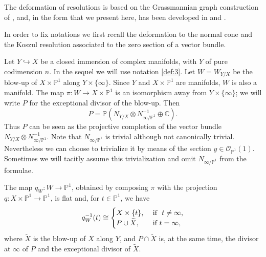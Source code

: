 \documentclass[10pt,twoside]{article}
\numberwithin{equation}{section}
\theoremstyle{plain}
\theoremstyle{definition}
\begin{document}
The deformation
of resolutions is based on the Grassmannian 
graph construction of \cite{BaumFultonMacPherson:RRsv}, and, in the
form that we present here, has been developed in  
\cite{BismutGilletSoule:MR1086887} and \cite{GilletSoule:aRRt}.

In order to fix notations we first recall the deformation to the
normal cone and the Koszul resolution associated to the
zero section of a vector bundle.

Let $Y\hookrightarrow X$ be a closed immersion of complex manifolds,
with $Y$ of pure codimension $n$. In the sequel we will use 
notation \ref{def:3}.
Let $W=W_{Y/X}$ be the blow-up of $X\times \mathbb{P}^{1}$ along
$Y\times \{\infty\}$. Since $Y$ and $X\times \mathbb{P}^{1}$ are
manifolds, $W$ is also a manifold. The map $\pi \colon W\longrightarrow
X\times \mathbb{P}^{1}$ is an isomorphism away from $Y\times \{\infty\}$; we
will write $P$ for the exceptional divisor of the blow-up. Then
\begin{displaymath}
  P=
  \mathbb{P}(N_{Y/X}\otimes N^{-1}_{\infty/\mathbb{P}^{1}}\oplus \mathbb{C}).
\end{displaymath}
 Thus $P$ can be seen 
as the projective completion of the vector bundle $N_{Y/X}\otimes
N^{-1}_{\infty/\mathbb{P}^{1}}$. Note that $N_{\infty/\mathbb{P}^{1}}$
is trivial although not canonically trivial. Nevertheless we can
choose to trivialize it by means of the
section $y\in \mathcal{O}_{\mathbb{P}^{1}}(1)$.
Sometimes we will tacitly assume this trivialization and omit
$N_{\infty/\mathbb{P}^{1}}$ from the formulae. 

The map $q_{W}\colon W\longrightarrow \mathbb{P}^{1}$, obtained by composing
$\pi $ with the projection $q\colon X\times \mathbb{P}^{1}\longrightarrow
\mathbb{P}^{1}$, is flat and, 
for $t\in \mathbb{P}^{1}$, we have
\begin{displaymath}
  q_{W}^{-1}(t) \cong
  \begin{cases}
    X\times\{t\},&$\text{ if } $t\not = \infty, \\
    P\cup \widetilde X, &\text{ if } t=\infty,
  \end{cases}
\end{displaymath}
where $\widetilde X$ is the blow-up of $X$ along $Y$, and $P\cap
\widetilde X$ is, at the same time, the divisor at $\infty$ of $P$ and the
exceptional divisor of $\widetilde X$. 
\end{document}
